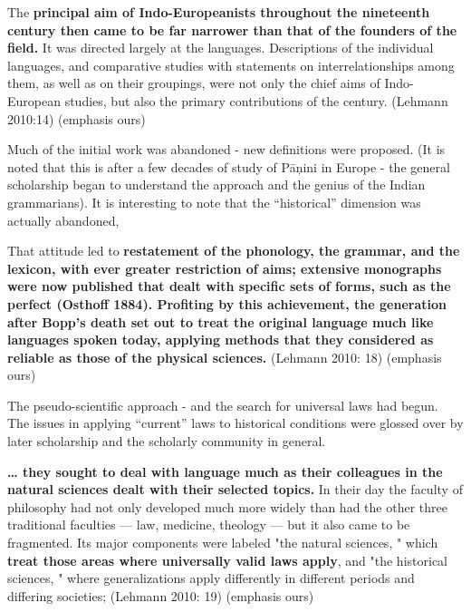 \begin{myquote}
The \textbf{principal aim of Indo-Europeanists throughout the nineteenth century then came to be far narrower than that of the founders of the field.} It was directed largely at the languages. Descriptions of the individual languages, and comparative studies with statements on interrelationships among them, as well as on their groupings, were not only the chief aims of Indo-European studies, but also the primary contributions of the century. (Lehmann 2010:14) (emphasis ours)
\end{myquote}

Much of the initial work was abandoned - new definitions were proposed. (It is noted that this is after a few decades of study of Pāņini in Europe - the general scholarship began to understand the approach and the genius of the Indian grammarians). It is interesting to note that the “historical” dimension was actually abandoned,

\begin{myquote}
That attitude led to \textbf{restatement of the phonology, the grammar, and the lexicon, with ever greater restriction of aims; extensive monographs were now published that dealt with specific sets of forms, such as the perfect (Osthoff 1884). Profiting by this achievement, the generation after Bopp's death set out to treat the original language much like languages spoken today, applying methods that they considered as reliable as those of the physical sciences.} (Lehmann 2010: 18) (emphasis ours)
\end{myquote}

The pseudo-scientific approach - and the search for universal laws had begun. The issues in applying “current” laws to historical conditions were glossed over by later scholarship and the scholarly community in general.

\begin{myquote}
\textbf{… they sought to deal with language much as their colleagues in the natural sciences dealt with their selected topics.} In their day the faculty of philosophy had not only developed much more widely than had the other three traditional faculties — law, medicine, theology — but it also came to be fragmented. Its major components were labeled "the natural sciences, " which \textbf{treat those areas where universally valid laws apply}, and "the historical sciences, " where generalizations apply differently in different periods and differing societies; (Lehmann 2010: 19) (emphasis ours)
\end{myquote}

